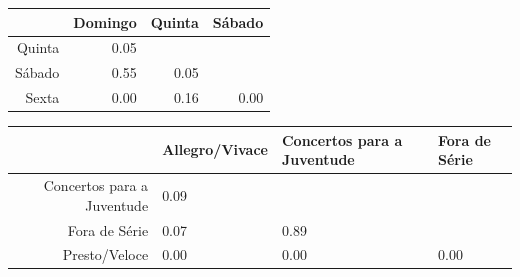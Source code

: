 \documentclass[a4paper, 12pt, openright, oneside, german, french, english, brazil]{abntex2}
\begin{document}
        \begin{table}[ht]
          {\begin{tabular}{r|rrr}
            \hline
            & Domingo & Quinta & Sábado \\ 
            \hline
            Quinta & 0.05 &  &  \\ 
            Sábado & 0.55 & 0.05 &  \\ 
            Sexta & 0.00 & 0.16 & 0.00 \\ 
            \hline
           \end{tabular}
         }
         {}
        \end{table}



        \begin{table}[ht]
          {\begin{tabular}{r|p{2.5cm}p{2.5cm}p{2.5cm}}
             \hline
             & Allegro/Vivace & Concertos para a Juventude & Fora de Série \\ 
             \hline
             Concertos para a Juventude & 0.09 &  &  \\ 
             Fora de Série & 0.07 & 0.89 &  \\ 
             Presto/Veloce & 0.00 & 0.00 & 0.00 \\ 
             \hline
           \end{tabular}
         }
         {}
        \end{table}
\end{document}
